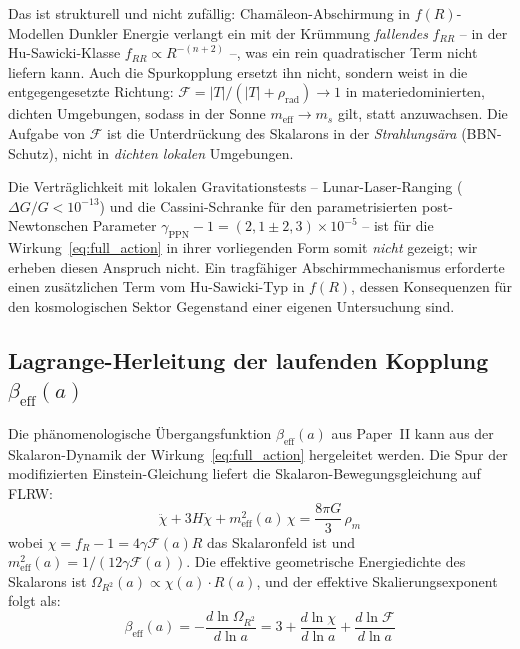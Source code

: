 \documentclass[11pt,a4paper]{article}
\begin{document}
Das ist strukturell und nicht zuf\"allig: Cham\"aleon-Abschirmung in $f(R)$-Modellen Dunkler Energie verlangt ein mit der Kr\"ummung \textit{fallendes} $f_{RR}$ -- in der Hu-Sawicki-Klasse $f_{RR} \propto R^{-(n+2)}$ \cite{HuSawicki2007} --, was ein rein quadratischer Term nicht liefern kann. Auch die Spurkopplung ersetzt ihn nicht, sondern weist in die entgegengesetzte Richtung: $\mathcal{F} = |T|/(|T| + \rho_{\mathrm{rad}}) \to 1$ in materiedominierten, dichten Umgebungen, sodass in der Sonne $m_{\mathrm{eff}} \to m_s$ gilt, statt anzuwachsen. Die Aufgabe von $\mathcal{F}$ ist die Unterdr\"uckung des Skalarons in der \textit{Strahlungs\"ara} (BBN-Schutz), nicht in \textit{dichten lokalen} Umgebungen.

Die Vertr\"aglichkeit mit lokalen Gravitationstests -- Lunar-Laser-Ranging ($\Delta G/G < 10^{-13}$) \cite{Williams2004} und die Cassini-Schranke f\"ur den parametrisierten post-Newtonschen Parameter $\gamma_{\mathrm{PPN}} - 1 = (2{,}1 \pm 2{,}3) \times 10^{-5}$ \cite{Bertotti2003} -- ist f\"ur die Wirkung~\eqref{eq:full_action} in ihrer vorliegenden Form somit \textit{nicht} gezeigt; wir erheben diesen Anspruch nicht. Ein tragf\"ahiger Abschirmmechanismus erforderte einen zus\"atzlichen Term vom Hu-Sawicki-Typ in $f(R)$, dessen Konsequenzen f\"ur den kosmologischen Sektor Gegenstand einer eigenen Untersuchung sind.

\subsection{Lagrange-Herleitung der laufenden Kopplung $\beta_{\mathrm{eff}}(a)$}
\label{subsec:beta_derivation}

Die ph\"anomenologische \"Ubergangsfunktion $\beta_{\mathrm{eff}}(a)$ aus Paper~II kann aus der Skalaron-Dynamik der Wirkung~\eqref{eq:full_action} hergeleitet werden. Die Spur der modifizierten Einstein-Gleichung liefert die Skalaron-Bewegungsgleichung auf FLRW:
\begin{equation}
\ddot{\chi} + 3H\dot{\chi} + m_{\mathrm{eff}}^2(a)\,\chi = \frac{8\pi G}{3}\,\rho_m
\label{eq:scalaron_eom}
\end{equation}
wobei $\chi = f_R - 1 = 4\gamma\mathcal{F}(a) R$ das Skalaronfeld ist und $m_{\mathrm{eff}}^2(a) = 1/(12\gamma\mathcal{F}(a))$. Die effektive geometrische Energiedichte des Skalarons ist $\Omega_{R^2}(a) \propto \chi(a) \cdot R(a)$, und der effektive Skalierungsexponent folgt als:
\begin{equation}
{\beta_{\mathrm{eff}}(a) = -\frac{d\ln\Omega_{R^2}}{d\ln a} = 3 + \frac{d\ln\chi}{d\ln a} + \frac{d\ln\mathcal{F}}{d\ln a}}
\label{eq:beta_from_lagrangian}
\end{equation}
\end{document}
